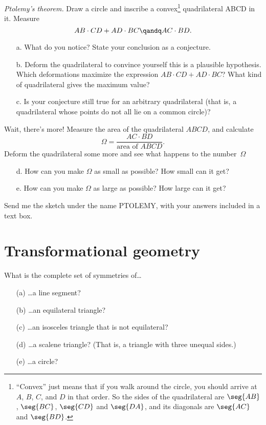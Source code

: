 \begin{SA} \textit{Ptolemy's theorem.}
Draw a circle and inscribe a convex\footnote{%
  ``Convex'' just means that if you walk around the circle, you
  should arrive at $A$, $B$, $C$, and $D$ in that order.  So the
  sides of the quadrilateral are $\seg{AB}$, $\seg{BC}$, $\seg{CD}$
  and $\seg{DA}$, and its diagonals are $\seg{AC}$ and $\seg{BD}$.}
quadrilateral ABCD in it. Measure
  $$AB\cdot CD+AD\cdot BC \qandq AC\cdot BD.$$
\begin{itemize}
\item[a.] What do you notice? State your conclusion as a conjecture.
\item[b.] Deform the quadrilateral to convince yourself this is a plausible
hypothesis. Which deformations maximize the expression 
$AB\cdot CD + AD\cdot BC$? What kind of quadrilateral gives the maximum value?
\item[c.] Is your conjecture still true for an arbitrary quadrilateral (that is,
a quadrilateral whose points do not all lie on a common circle)?
\end{itemize}
Wait, there's more!  Measure the area of the quadrilateral $ABCD$,
and calculate
  $$\Omega = \frac{AC\cdot BD}{\text{area of } ABCD}.$$
Deform the quadrilateral some more and see what happens to the
number~$\Omega$
\begin{itemize}
\item[d.] How can you make $\Omega$ as small as possible?  How small can it get?
\item[e.] How can you make $\Omega$ as large as possible?  How large can it get?
\end{itemize}
Send me the sketch under the name PTOLEMY, with your answers included in a
text box.
\end{SA}
\pagebreak

\section{Transformational geometry}

\begin{TG}
What is the complete set of symmetries of\dots
\begin{itemize}
\item[(a)] \dots a line segment?
\item[(b)] \dots an equilateral triangle?
\item[(c)] \dots an isosceles triangle that is not equilateral?
\item[(d)] \dots a scalene triangle?  (That is, a triangle with
three unequal sides.)
\item[(e)] \dots a circle?
\end{itemize}
\end{TG}

